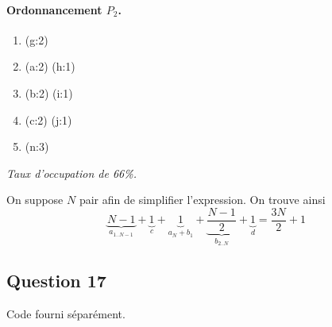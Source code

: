 \documentclass[11pt]{article}
\newenvironment{titledenumerate}[1]
  {\paragraph{#1} \begin{enumerate}}
  {\end{enumerate}}
\begin{document}
\begin{multicols}{3}
      \begin{titledenumerate}{Ordonnancement $P_2$.}
        \item (g:2)
        \item (a:2) (h:1)
        \item (b:2) (i:1)
        \item (c:2) (j:1)
        \item (n:3)
      \end{titledenumerate}
      \emph{Taux d'occupation de 66\%.}
    \end{multicols}

    On suppose $N$ pair afin de simplifier l'expression. On trouve ainsi
    \[ \underbrace{N-1}_{a_{1..N-1}} + \underbrace{1}_{c} + \underbrace{1}_{a_N
    + b_1} + \underbrace{\frac{N-1}{2}}_{b_{2..N}} + \underbrace{1}_{d} =
    \frac{3N}{2} + 1 \]

  \subsection{Question 17}
    Code fourni séparément.
\end{document}
